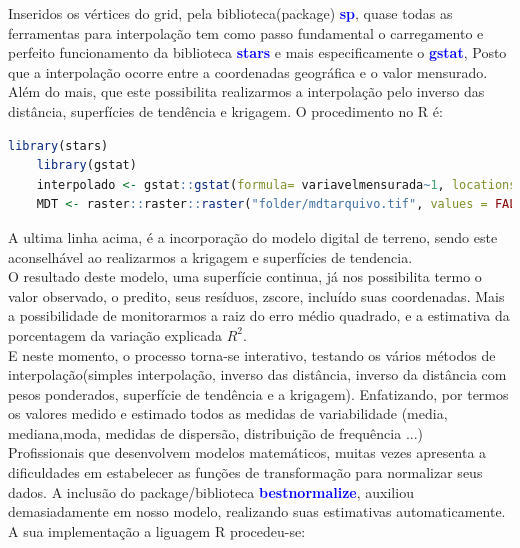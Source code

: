  \hspace*{1.25 cm} Inseridos os vértices do grid, pela biblioteca(package) \textbf{\textcolor{blue}{sp}}, quase todas as ferramentas para interpolação tem como passo fundamental o carregamento e perfeito funcionamento da biblioteca \textbf{\textcolor{blue}{stars}} e mais especificamente o \textbf{\textcolor{blue}{gstat}}, Posto que a interpolação ocorre entre a coordenadas geográfica e o valor mensurado. Além do mais, que este possibilita realizarmos a interpolação pelo inverso das distância, superfícies de tendência e krigagem.  O procedimento no R é: 
 \lstset{
	language=R, %
	caption= Interpolação em linguagem R,} %
\begin{lstlisting}[language=R]
	library(stars)
	library(gstat)
	interpolado <- gstat::gstat(formula= variavelmensurada~1, locations = arquivodogrid, set = parametrosdomodelo )	 
	MDT <- raster::raster::raster("folder/mdtarquivo.tif", values = FALSE)  
\end{lstlisting}  
\hspace*{1.25 cm}  A ultima linha acima, é a incorporação do modelo digital de terreno, sendo este aconselhável ao realizarmos a krigagem e superfícies de tendencia.\\
\hspace*{1.25 cm}  O resultado deste modelo, uma superfície continua, já nos possibilita termo o valor observado, o predito, seus resíduos, zscore, incluído suas coordenadas. Mais a possibilidade de monitorarmos a raiz do erro médio quadrado, e a estimativa da porcentagem da variação explicada $ R^{2}$.\\
\hspace*{1.25 cm}  E neste momento, o processo torna-se interativo, testando os vários métodos de interpolação(simples interpolação, inverso das distância, inverso da distância com pesos ponderados, superfície de tendência e a krigagem). Enfatizando, por  termos os valores medido e estimado todos as medidas de variabilidade (media, mediana,moda, medidas de dispersão, distribuição de frequência ...)  \\
%
\hspace*{1.25 cm}  Profissionais que desenvolvem modelos matemáticos, muitas vezes apresenta a dificuldades em estabelecer as funções de transformação para normalizar seus dados. A inclusão  do package/biblioteca \textbf{\textcolor{blue}{bestnormalize}}, auxiliou demasiadamente em nosso modelo, realizando suas estimativas automaticamente. A sua implementação a liguagem R procedeu-se:
